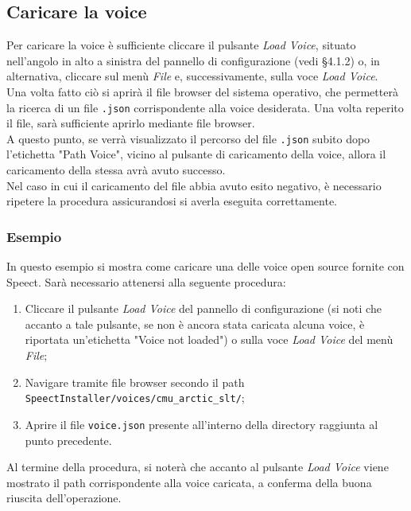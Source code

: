 \documentclass[openany,12pt,a4paper]{report}
\begin{document}
	\subsection{Caricare la voice}
	Per caricare la voice è sufficiente cliccare il pulsante \textit{Load Voice}, situato nell'angolo in alto a sinistra del pannello di configurazione (vedi §4.1.2) o, in alternativa, cliccare sul menù \textit{File} e, successivamente, sulla voce \textit{Load Voice}.\\
	Una volta fatto ciò si aprirà il file browser del sistema operativo, che permetterà la ricerca di un file \verb|.json| corrispondente alla voice desiderata. Una volta reperito il file, sarà sufficiente aprirlo mediante file browser.\\
	A questo punto, se verrà visualizzato il percorso del file \verb|.json| subito dopo l'etichetta "Path Voice", vicino al pulsante di caricamento della voice, allora il caricamento della stessa avrà avuto successo.\\
	Nel caso in cui il caricamento del file abbia avuto esito negativo, è necessario ripetere la procedura assicurandosi si averla eseguita correttamente.
	
	\subsubsection*{Esempio}
	
	In questo esempio si mostra come caricare una delle voice open source fornite con Speect. Sarà necessario attenersi alla seguente procedura:
	
	\begin{enumerate}
		\item Cliccare il pulsante \textit{Load Voice} del pannello di configurazione (si noti che accanto a tale pulsante, se non è ancora stata caricata alcuna voice, è riportata un'etichetta "Voice not loaded") o sulla voce \textit{Load Voice} del menù \textit{File};
		\item Navigare tramite file browser secondo il path \\ \verb|SpeectInstaller/voices/cmu_arctic_slt/|;
		\item Aprire il file \verb|voice.json| presente all'interno della directory raggiunta al punto precedente. 
	\end{enumerate} 

	\noindent Al termine della procedura, si noterà che accanto al pulsante \textit{Load Voice} viene mostrato il path corrispondente alla voice caricata, a conferma della buona riuscita dell'operazione.
	
\end{document}
